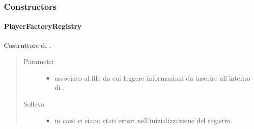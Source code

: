 \documentclass[letterpaper,10pt,italian,openany,oneside]{sphinxmanual}
\begin{document}
\subsubsection{Constructors}
\label{\detokenize{source/it/unicam/cs/pa/mastermind/players/PlayerFactoryRegistry:constructors}}

\paragraph{PlayerFactoryRegistry}
\label{\detokenize{source/it/unicam/cs/pa/mastermind/players/PlayerFactoryRegistry:id1}}

\begin{fulllineitems}
\label{\detokenize{source/it/unicam/cs/pa/mastermind/players/PlayerFactoryRegistry:it.unicam.cs.pa.mastermind.players.PlayerFactoryRegistry.PlayerFactoryRegistry(String)}}
Costruttore di .
\begin{quote}\begin{description}
\item[{Parametri}] \leavevmode\begin{itemize}
\item {} 
 \textendash{} associato al file da cui leggere informazioni da inserire all’interno di .

\end{itemize}

\item[{Solleva}] \leavevmode\begin{itemize}
\item {} 
 \textendash{} in caso ci siano stati errori nell’inizializzazione del registro

\end{itemize}

\end{description}\end{quote}

\end{fulllineitems}
\end{document}
